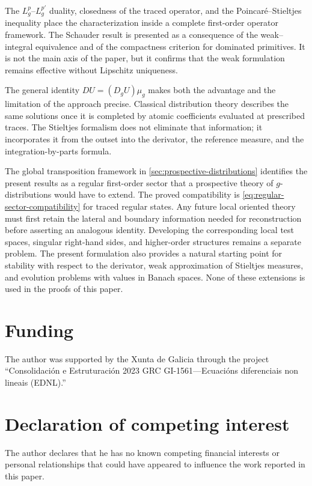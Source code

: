 \documentclass[preprint,12pt]{elsarticle}
\newcommand{\rev}[1]{{\color{red}#1}}
\newcommand{\rev}[1]{#1}
\newenvironment{finalrevision}{\begingroup\color{red}}{\endgroup}
\newenvironment{finalrevision}{}{}
\theoremstyle{definition}
\theoremstyle{remark}
\begin{document}
The $L_g^p$--$L_g^{p'}$ duality, closedness of the traced operator, and the Poincar\'e--Stieltjes inequality place the characterization inside a complete first-order operator framework. The Schauder result is presented as a consequence of the weak--integral equivalence and of the compactness criterion for dominated primitives. It is not the main axis of the paper, but it confirms that the weak formulation remains effective without Lipschitz uniqueness.

The general identity $DU=(D_gU)\mu_g$ makes both the advantage and the limitation of the approach precise. Classical distribution theory describes the same solutions once it is completed by atomic coefficients evaluated at prescribed traces. The Stieltjes formalism does not eliminate that information; it incorporates it from the outset into the derivator, the reference measure, and the integration-by-parts formula.

\begin{finalrevision}
The global transposition framework in \cref{sec:prospective-distributions}
identifies the present results as a regular first-order sector that a
prospective theory of \(g\)-distributions would have to extend. The proved
compatibility is \eqref{eq:regular-sector-compatibility} for traced regular
states. Any future local oriented theory must first retain the lateral and
boundary information needed for reconstruction before asserting an analogous
identity. Developing the corresponding local test spaces, singular
right-hand sides, and higher-order structures remains a separate problem. The
present formulation also provides a natural starting point for stability with
respect to the derivator, weak approximation of Stieltjes measures, and
evolution problems with values in Banach spaces. None of these extensions is
used in the proofs of this paper.
\end{finalrevision}


\section*{Funding}
\rev{The author was supported by the Xunta de Galicia through the project
``Consolidaci\'on e Estruturaci\'on 2023 GRC GI-1561---Ecuaci\'ons
diferenciais non lineais (EDNL).''}

\section*{Declaration of competing interest}
The author declares that he has no known competing financial interests or personal relationships that could have appeared to influence the work reported in this paper.
\end{document}
